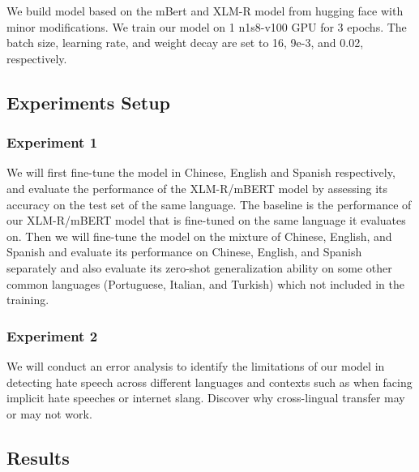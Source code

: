 \documentclass[11pt]{article}
\begin{document}
We build model based on the mBert and XLM-R model from hugging face with minor modifications. We train our model on 1 n1s8-v100 GPU for 3 epochs. The batch size, learning rate, and weight decay are set to 16, 9e-3, and 0.02, respectively. 
\subsection{Experiments Setup}
\subsubsection{Experiment 1}
We will first fine-tune the model in Chinese, English and Spanish respectively, and evaluate the performance of the XLM-R/mBERT model by assessing its accuracy on the test set of the same language. The baseline is the performance of our XLM-R/mBERT model that is fine-tuned on the same language it evaluates on. Then we will fine-tune the model on the mixture of Chinese, English, and Spanish and evaluate its performance on Chinese, English, and Spanish separately and also evaluate its zero-shot generalization ability on some other common languages (Portuguese, Italian, and Turkish) which not included in the training.
\subsubsection{Experiment 2}
We will conduct an error analysis to identify the limitations of our model in detecting hate speech across different languages and contexts such as when facing implicit hate speeches or internet slang. Discover why cross-lingual transfer may or may not work.
\subsection{Results}
\end{document}
